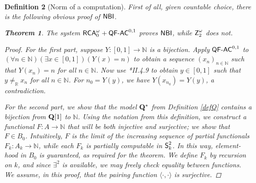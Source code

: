 \documentclass[reqno]{amsart}
\newtheorem{thm}{Theorem}
\newtheorem{defi}[thm]{Definition}
\def\Z{\textup{\textsf{Z}}}
\def\RCAo{\textup{\textsf{RCA}}_{0}^{\omega}}
\def\N{{\mathbb  N}}
\def\R{{\mathbb  R}}
\def\di{\rightarrow}
\def\QFAC{\textup{\textsf{QF-AC}}}
\def\NBIJ{\textup{\textsf{NBI}}}
\def\SS{\textup{\textsf{S}}}
\numberwithin{equation}{section}
\numberwithin{thm}{section}
\begin{document}
\begin{defi}[Norm of a computation]
First of all, given countable choice, there is the following obvious proof of $\NBIJ$.  
\begin{thm}\label{proleet}
The system $\RCAo+\QFAC^{0,1}$ proves $\NBIJ$, while $\Z_{2}^{\omega}$ does not.  
\end{thm}
\begin{proof}
For the first part, suppose $Y:[0,1]\di \N$ is a bijection.  Apply $\QFAC^{0,1}$ to $(\forall n\in \N)(\exists x\in [0,1])(Y(x)=n)$ to obtain a sequence $(x_{n})_{n\in \N}$ such that $Y(x_{n})=n$ for all $n\in \N$.  
Now use \cite{simpson2}*{II.4.9} to obtain $y\in [0,1]$ such that $y\ne_{\R} x_{n}$ for all $n\in \N$.  For $n_{0}=Y(y)$, we have $Y(x_{n_{0}})=Y(y)$, a contradiction. 

\smallskip

For the second part, we show that the model ${\bf Q}^*$ from Definition \ref{defQ} contains a bijection from ${\bf Q}[1]$ to $\N$. 
Using the notation from this definition, we construct a functional $F:A \rightarrow \N$ that will be both injective and surjective; we show that $F \in B_{0}$. 
Intuitively, $F$ is the limit of the increasing sequence of partial functionals $F_k:A_k \rightarrow \N$, while each $F_k$ is partially computable in $\SS^{2}_{k}$.  In this way, element-hood in $B_{0}$ is guaranteed, as required for the theorem. 
We define $F_k$ by recursion on $k$, and since $\exists^2$ is available, we may freely check equality between functions. We assume, in this proof, that the pairing function $\langle \cdot , \cdot \rangle$ is surjective.

\smallskip


\end{proof}
\end{defi}
\end{document}
